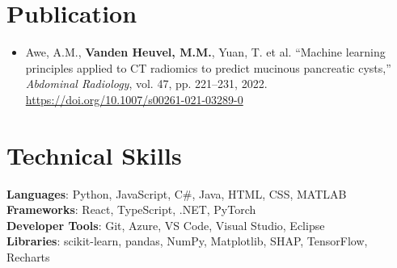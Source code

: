 \documentclass[letterpaper,11pt]{article}
\newcommand{\resumeItem}[1]{
  \item\small{
    {#1 \vspace{-2pt}}
  }
}
\newcommand{\resumeItemListStart}{\begin{itemize}}
\newcommand{\resumeItemListEnd}{\end{itemize}\vspace{-5pt}}
\begin{document}
\section{Publication}
  \resumeItemListStart
      \resumeItem{Awe, A.M., \textbf{Vanden Heuvel, M.M.}, Yuan, T. et al. ``Machine learning principles applied to CT radiomics to predict mucinous pancreatic cysts,'' \textit{Abdominal Radiology}, vol. 47, pp. 221–231, 2022. \href{https://doi.org/10.1007/s00261-021-03289-0}{https://doi.org/10.1007/s00261-021-03289-0}}
  \resumeItemListEnd

\section{Technical Skills}
 \begin{itemize}[leftmargin=0.15in, label={}]
    \small{\item{
     \textbf{Languages}{: Python, JavaScript, C\#, Java, HTML, CSS, MATLAB} \\
     \textbf{Frameworks}{: React, TypeScript, .NET, PyTorch} \\
     \textbf{Developer Tools}{: Git, Azure, VS Code, Visual Studio, Eclipse} \\
     \textbf{Libraries}{: scikit-learn, pandas, NumPy, Matplotlib, SHAP, TensorFlow, Recharts}
    }}
 \end{itemize}


\end{document}
